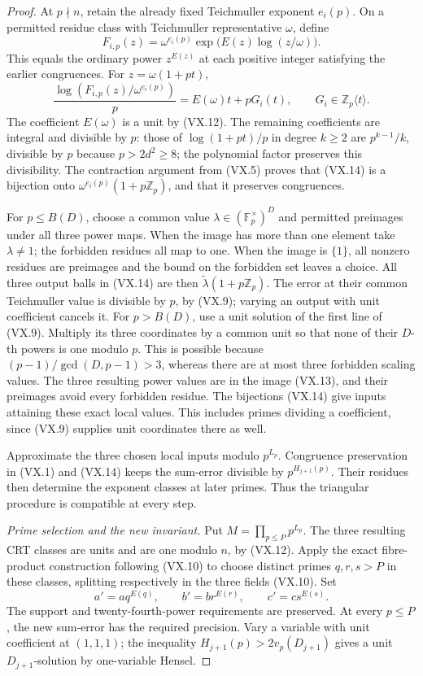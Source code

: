 \begin{proof}
At \(p\nmid n\), retain the already fixed
Teichmuller exponent \(e_i(p)\). On a permitted
residue class with Teichmuller representative
\(\omega\), define
\[
 F_{i,p}(z)=\omega^{e_i(p)}
       \exp\bigl(E(z)\log(z/\omega)\bigr).
 \tag{VX.14}
\]
This equals the ordinary power \(z^{E(z)}\)
at each positive integer satisfying the earlier
congruences. For \(z=\omega(1+pt)\),
\[
 \frac{\log(F_{i,p}(z)/\omega^{e_i(p)})}{p}
       =E(\omega)t+pG_i(t),
 \qquad G_i\in\mathbb Z_p\langle t\rangle.
 \tag{VX.15}
\]
The coefficient \(E(\omega)\) is a unit by (VX.12).
The remaining coefficients are integral and
divisible by \(p\): those of
\(\log(1+pt)/p\) in degree \(k\ge2\)
are \(p^{k-1}/k\), divisible by \(p\) because
\(p>2d^2\ge8\); the polynomial factor preserves
this divisibility. The contraction argument
from (VX.5) proves that (VX.14) is a bijection
onto \(\omega^{e_i(p)}(1+p\mathbb Z_p)\),
and that it preserves congruences.

For \(p\le B(D)\), choose a common value
\(\lambda\in(\mathbb F_p^\times)^D\) and
permitted preimages under all three power maps.
When the image has more than one element take
\(\lambda\ne1\); the forbidden residues all
map to one. When the image is \(\{1\}\),
all nonzero residues are preimages and the
bound on the forbidden set leaves a choice.
All three output balls in (VX.14) are then
\(\widetilde\lambda(1+p\mathbb Z_p)\).
The error at their common Teichmuller value
is divisible by \(p\), by (VX.9); varying an
output with unit coefficient cancels it.
For \(p>B(D)\), use a unit solution of the
first line of (VX.9). Multiply its three
coordinates by a common unit so that none
of their \(D\)-th powers is one modulo \(p\).
This is possible because
\((p-1)/\gcd(D,p-1)>3\), whereas there are
at most three forbidden scaling values.
The three resulting power values are in the
image (VX.13), and their preimages avoid every
forbidden residue. The bijections (VX.14)
give inputs attaining these exact local
values. This includes primes dividing a
coefficient, since (VX.9) supplies unit
coordinates there as well.

Approximate the three chosen local inputs
modulo \(p^{L_p}\). Congruence preservation
in (VX.1) and (VX.14) keeps the sum-error
divisible by \(p^{H_{j+1}(p)}\).
Their residues then determine the exponent
classes at later primes. Thus the triangular
procedure is compatible at every step.

\emph{Prime selection and the new invariant.}
Put \(M=\prod_{p\le P}p^{L_p}\). The three
resulting CRT classes are units and are one
modulo \(n\), by (VX.12). Apply the exact
fibre-product construction following (VX.10)
to choose distinct primes \(q,r,s>P\) in
these classes, splitting respectively in
the three fields (VX.10). Set
\[
 a'=a q^{E(q)},\qquad b'=b r^{E(r)},\qquad
 c'=c s^{E(s)}.
 \tag{VX.16}
\]
The support and twenty-fourth-power requirements
are preserved. At every \(p\le P\), the
new sum-error has the required precision.
Vary a variable with unit coefficient at
\((1,1,1)\); the inequality
\(H_{j+1}(p)>2v_p(D_{j+1})\) gives a unit
\(D_{j+1}\)-solution by one-variable Hensel.


\end{proof}
